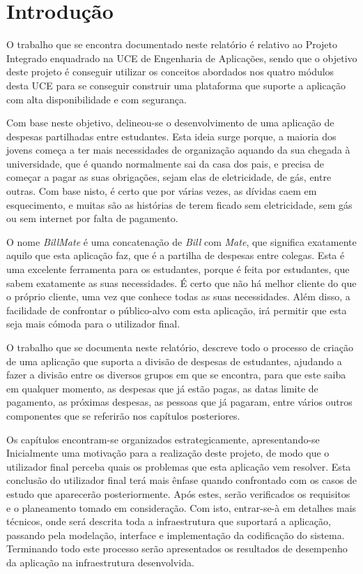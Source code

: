 \chapter[Introdução]
{Introdu\c{c}\~ao}


O trabalho que se encontra documentado neste relatório é relativo ao Projeto Integrado enquadrado na UCE de Engenharia de Aplicações, sendo que o objetivo deste projeto é conseguir utilizar os conceitos abordados nos quatro módulos desta UCE para se conseguir construir uma plataforma que suporte a aplicação com alta disponibilidade e com segurança.

Com base neste objetivo, delineou-se o desenvolvimento de uma aplicação de despesas partilhadas entre estudantes. Esta ideia surge porque, a maioria dos jovens começa a ter mais necessidades de organização aquando da sua chegada à universidade, que é quando normalmente sai da casa dos pais, e precisa de começar a pagar as suas obrigações, sejam elas de eletricidade, de gás, entre outras. Com base nisto, é certo que por várias vezes, as dívidas caem em esquecimento, e muitas são as histórias de terem ficado sem eletricidade, sem gás ou sem internet por falta de pagamento.

O nome \emph{BillMate} é uma concatenação de \emph{Bill} com \emph{Mate}, que significa exatamente aquilo que esta aplicação faz, que é a partilha de despesas entre colegas. Esta é uma excelente ferramenta para os estudantes, porque é feita por estudantes, que sabem exatamente as suas necessidades. É certo que não há melhor cliente do que o próprio cliente, uma vez que conhece todas as suas necessidades. Além disso, a facilidade de confrontar o público-alvo com esta aplicação, irá permitir que esta seja mais cómoda para o utilizador final.

O trabalho que se documenta neste relatório, descreve todo o processo de criação de uma aplicação que suporta a divisão de despesas de estudantes, ajudando a fazer a divisão entre os diversos grupos em que se encontra, para que este saiba em qualquer momento, as despesas que já estão pagas, as datas limite de pagamento, as próximas despesas, as pessoas que já pagaram, entre vários outros componentes que se referirão nos capítulos posteriores.

Os capítulos encontram-se organizados estrategicamente, apresentando-se Inicialmente uma motivação para a realização deste projeto, de modo que o utilizador final perceba quais os problemas que esta aplicação vem resolver. Esta conclusão do utilizador final terá mais ênfase quando confrontado com os casos de estudo que aparecerão posteriormente. Após estes, serão verificados os requisitos e o planeamento tomado em consideração. Com isto, entrar-se-à em detalhes mais técnicos, onde será descrita toda a infraestrutura que suportará a aplicação, passando pela modelação, interface e implementação da codificação do sistema.
Terminando todo este processo serão apresentados os resultados de desempenho da aplicação na infraestrutura desenvolvida.
